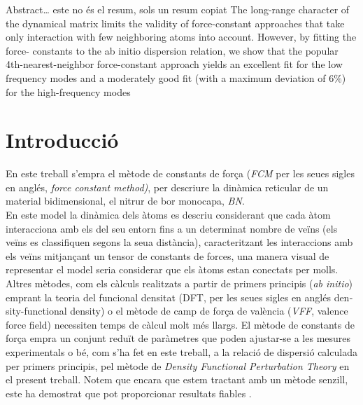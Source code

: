 \documentclass[12pt]{article} %
\begin{document}
\begin{otherlanguage}{english}\itshape

\noindent Abstract\ldots
este no és el resum, sols un resum copiat
The long-range character of the dynamical matrix limits the validity of
force-constant approaches that take only interaction with few neighboring atoms into account. However, by fitting the force-
constants to the ab initio dispersion relation, we show that the popular 4th-nearest-neighbor force-constant approach yields an
excellent fit for the low frequency modes and a moderately good fit (with a 
maximum deviation of $6 \%$) for the high-frequency modes \cite{wirtz04_phonon_disper_graph_revis}
\end{otherlanguage}



\section{Introducció}

En este treball s'empra el mètode de constants de força (\emph{FCM} per les seues sigles en anglés, \emph{\foreignlanguage{english}{force constant method})}, per descriure la dinàmica reticular de un material bidimensional, el nitrur de bor monocapa, \emph{BN}.\\

En este model la dinàmica dels àtoms es descriu considerant que cada àtom interacciona amb els del seu entorn fins a un determinat nombre de veïns (els veïns es classifiquen segons la seua distància), caracteritzant les interaccions amb els veïns mitjançant un tensor de constants de forces, una manera visual de representar el model seria considerar que els àtoms estan conectats per molls. Altres mètodes, com els càlculs realitzats a partir de primers principis (\emph{ab initio}) emprant la teoria del funcional densitat (DFT, per les seues sigles en anglés \foreignlanguage{english}{density-functional density}) o el mètode de camp de força de valència (\emph{VFF}, \foreignlanguage{english}{valence force field}) necessiten temps de càlcul molt més llargs. El mètode de constants de força empra un conjunt reduït de paràmetres que poden ajustar-se a les mesures experimentals o bé, com s'ha fet en este treball, a la relació de dispersió calculada per primers principis, pel mètode de \emph{Density Functional Perturbation Theory} en el present treball.  Notem que encara que estem tractant amb un mètode senzill, este ha demostrat que pot proporcionar resultats fiables \cite{wirtz04_phonon_disper_graph_revis}.
\end{document}
